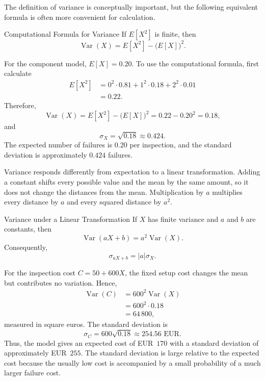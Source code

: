 The definition of variance is conceptually important, but the following equivalent formula is often more convenient for calculation.

\begin{theorem}{Computational Formula for Variance}
    If $E[X^2]$ is finite, then
    \[
    \operatorname{Var}(X)=E[X^2]-\big(E[X]\big)^2.
    \]
\end{theorem}

\clearpage
\begin{example}\par
For the component model, $E[X]=0.20$. To use the computational formula, first calculate
\[
\begin{aligned}
E[X^2]
&=0^2\cdot0.81+1^2\cdot0.18+2^2\cdot0.01\\
&=0.22.
\end{aligned}
\]
Therefore,
\[
\operatorname{Var}(X)
=E[X^2]-\big(E[X]\big)^2
=0.22-0.20^2
=0.18,
\]
and
\[
\sigma_X=\sqrt{0.18}\approx0.424.
\]
The expected number of failures is $0.20$ per inspection, and the standard deviation is approximately $0.424$ failures.
\end{example}

Variance responds differently from expectation to a linear transformation. Adding a constant shifts every possible value and the mean by the same amount, so it does not change the distances from the mean. Multiplication by $a$ multiplies every distance by $a$ and every squared distance by $a^2$.

\begin{theorem}{Variance under a Linear Transformation}
    If $X$ has finite variance and $a$ and $b$ are constants, then
    \[
    \operatorname{Var}(aX+b)=a^2\operatorname{Var}(X).
    \]
    Consequently,
    \[
    \sigma_{aX+b}=|a|\sigma_X.
    \]
\end{theorem}

\begin{example}\par
For the inspection cost $C=50+600X$, the fixed setup cost changes the mean but contributes no variation. Hence,
\[
\begin{aligned}
\operatorname{Var}(C)
&=600^2\operatorname{Var}(X)\\
&=600^2\cdot0.18\\
&=64\,800,
\end{aligned}
\]
measured in square euros. The standard deviation is
\[
\sigma_C=600\sqrt{0.18}\approx254.56\text{ EUR}.
\]
Thus, the model gives an expected cost of EUR~$170$ with a standard deviation of approximately EUR~$255$. The standard deviation is large relative to the expected cost because the usually low cost is accompanied by a small probability of a much larger failure cost.
\end{example}

